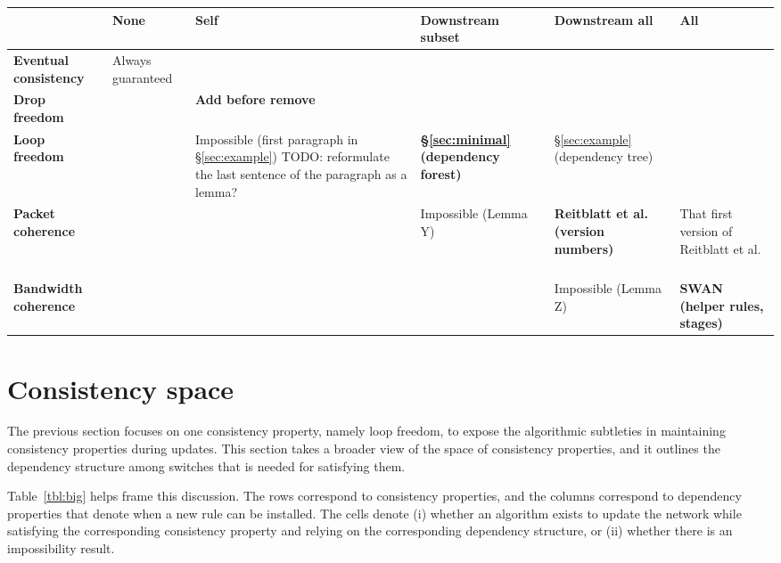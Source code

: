 \begin{table*}[t!]
\begin{center}
\begin{tabular}{p{1in}|p{1in}|p{1in}|p{1in}|p{1in}|p{1in}|}
&
  \textbf{None}
&
  \textbf{Self}  
&
  \textbf{Downstream subset}
&
  \textbf{Downstream all}
&
  \textbf{All}
\ \\ \hline

  \textbf{Eventual consistency}
&
  Always guaranteed
&
&
&
&
\ \\ \hline

  \textbf{Drop freedom}
&
&
  \textbf{Add before remove}
&
&
&
\ \\ \hline

  \textbf{Loop freedom}
&
&
  Impossible (first paragraph in \S\ref{sec:example}) TODO: reformulate the last sentence of the paragraph as a lemma?
&
  \textbf{\S\ref{sec:minimal} (dependency forest)}
&
  \S\ref{sec:example} (dependency tree)
&
\ \\ \hline

  \textbf{Packet coherence}
&
&

&
  Impossible (Lemma Y)
&
  \textbf{Reitblatt et al.~\cite{safeupdate} (version numbers)}
&
  That first version of Reitblatt et al. \cite{dontknow}
\ \\ \hline

  \textbf{Bandwidth coherence}
&
&

&

&
  Impossible (Lemma Z)
&
  \textbf{SWAN~\cite{swan} (helper rules, stages)}
\ \\ \hline
\end{tabular}
\end{center}
\caption{something}
\label{tbl:big}
\end{table*}

\section{Consistency space}
\label{sec:table}

The previous section focuses on one consistency property, namely loop freedom, to expose the algorithmic subtleties in maintaining consistency properties during updates. This section takes a broader view of the space of consistency properties, and it outlines the dependency structure among switches that is needed for satisfying them.

Table~\ref{tbl:big} helps frame this discussion. The rows correspond to consistency properties, and the columns correspond to dependency properties that denote when a new rule can be installed. The cells denote (i) whether an algorithm exists to update the network while satisfying the corresponding consistency property and relying on the corresponding dependency structure, or (ii) whether there is an impossibility result.

